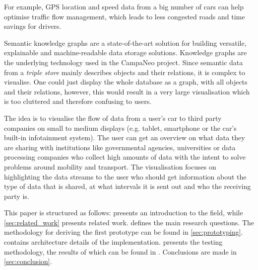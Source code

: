 \documentclass[../paper.tex]{subfiles}
\begin{document}
  For example, GPS location and speed data from a big number of cars can help
  optimise traffic flow management, which leads to less congested roads and
  time savings for drivers.

  Semantic knowledge graphs are a state-of-the-art solution for building
  versatile, explainable and machine-readable data storage solutions. Knowledge
  graphs are the underlying technology used in the CampaNeo project. Since
  semantic data from a \textit{triple store} mainly describes objects and their
  relations, it is complex to visualise. One could just display the whole
  database as a graph, with all objects and their relations, however, this
  would result in a very large visualisation which is too cluttered and
  therefore confusing to users.

  The idea is to visualise the flow of data from a user’s car to third party
  companies on small to medium displays (e.g. tablet, smartphone or the car’s
  built-in infotainment system). The user can get an overview on what data they
  are sharing with institutions like governmental agencies, universities or
  data processing companies who collect high amounts of data with the intent to
  solve problems around mobility and transport. The visualisation
  focuses on highlighting the data streams to the user who should get
  information about the type of data that is shared, at what intervals it is
  sent out and who the receiving party is.

  This paper is structured as follows:  presents an
  introduction to the field, while \cref{sec:related_work} presents related
  work.  defines the main research questions. The
  methodology for deriving the first prototype can be found in
  \cref{sec:prototyping}.  contains architecture
  details of the implementation.  presents the
  testing methodology, the results of which can be found in .
  Conclusions are made in \cref{sec:conclusion}.
\end{document}
